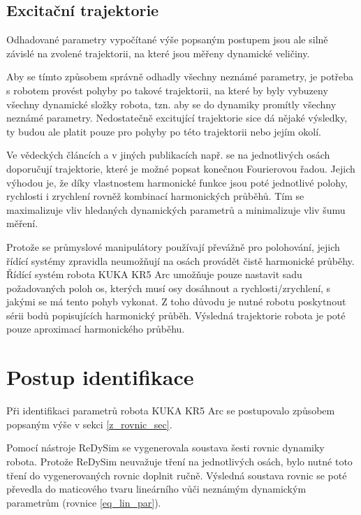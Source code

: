 \subsection{Excitační trajektorie}

Odhadované parametry vypočítané výše popsaným postupem jsou ale silně závislé na zvolené trajektorii, na které jsou měřeny dynamické veličiny. 

Aby se tímto způsobem správně odhadly všechny neznámé parametry, je potřeba s robotem provést pohyby po takové trajektorii, na které by byly vybuzeny všechny dynamické složky robota, tzn. aby se do dynamiky promítly všechny neznámé parametry. Nedostatečně excitující trajektorie sice dá nějaké výsledky, ty budou ale platit pouze pro pohyby po této trajektorii nebo jejím okolí.

Ve vědeckých článcích a v jiných publikacích např. \cite{clos_dyn_par}\cite{dyn_mod_ind}\cite{dyn_ind_mits} se na jednotlivých osách doporučují trajektorie, které je možné popsat konečnou Fourierovou řadou. Jejich výhodou je, že díky vlastnostem harmonické funkce jsou poté jednotlivé polohy, rychlosti i zrychlení rovněž kombinací harmonických průběhů. Tím se maximalizuje vliv hledaných dynamických parametrů a minimalizuje vliv šumu měření. 

Protože se průmyslové manipulátory používají převážně pro polohování, jejich řídící systémy zpravidla neumožňují na osách provádět čistě harmonické průběhy. Řídící systém robota KUKA KR5 Arc umožňuje pouze nastavit sadu požadovaných poloh os, kterých musí osy dosáhnout a rychlosti/zrychlení, s jakými se má tento pohyb vykonat. Z toho důvodu je nutné robotu poskytnout sérii bodů popisujících harmonický průběh. Výsledná trajektorie robota je poté pouze aproximací harmonického průběhu.  


\section{Postup identifikace}

Při identifikaci parametrů robota KUKA KR5 Arc se postupovalo způsobem popsaným výše v sekci \ref{z_rovnic_sec}. 

Pomocí nástroje ReDySim se vygenerovala soustava šesti rovnic dynamiky robota. Protože ReDySim neuvažuje tření na jednotlivých osách, bylo nutné toto tření do vygenerovaných rovnic doplnit ručně. Výsledná soustava rovnic se poté převedla do maticového tvaru lineárního vůči neznámým dynamickým parametrům (rovnice \ref{eq_lin_par}). 

